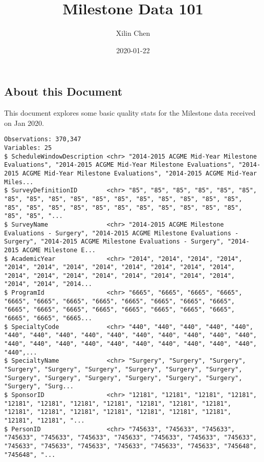 \documentclass[]{article}
\title{Milestone Data 101}
\author{Xilin Chen}
\date{2020-01-22}
\begin{document}
\maketitle

\hypertarget{about-this-document}{%
\subsection{About this Document}\label{about-this-document}}

This document explores some basic quality stats for the Milestone data
received on Jan 2020.

\begin{verbatim}
Observations: 370,347
Variables: 25
$ ScheduleWindowDescription <chr> "2014-2015 ACGME Mid-Year Milestone Evaluations", "2014-2015 ACGME Mid-Year Milestone Evaluations", "2014-2015 ACGME Mid-Year Milestone Evaluations", "2014-2015 ACGME Mid-Year Miles...
$ SurveyDefinitionID        <chr> "85", "85", "85", "85", "85", "85", "85", "85", "85", "85", "85", "85", "85", "85", "85", "85", "85", "85", "85", "85", "85", "85", "85", "85", "85", "85", "85", "85", "85", "85", "...
$ SurveyName                <chr> "2014-2015 ACGME Milestone Evaluations - Surgery", "2014-2015 ACGME Milestone Evaluations - Surgery", "2014-2015 ACGME Milestone Evaluations - Surgery", "2014-2015 ACGME Milestone E...
$ AcademicYear              <chr> "2014", "2014", "2014", "2014", "2014", "2014", "2014", "2014", "2014", "2014", "2014", "2014", "2014", "2014", "2014", "2014", "2014", "2014", "2014", "2014", "2014", "2014", "2014...
$ ProgramId                 <chr> "6665", "6665", "6665", "6665", "6665", "6665", "6665", "6665", "6665", "6665", "6665", "6665", "6665", "6665", "6665", "6665", "6665", "6665", "6665", "6665", "6665", "6665", "6665...
$ SpecialtyCode             <chr> "440", "440", "440", "440", "440", "440", "440", "440", "440", "440", "440", "440", "440", "440", "440", "440", "440", "440", "440", "440", "440", "440", "440", "440", "440", "440",...
$ SpecialtyName             <chr> "Surgery", "Surgery", "Surgery", "Surgery", "Surgery", "Surgery", "Surgery", "Surgery", "Surgery", "Surgery", "Surgery", "Surgery", "Surgery", "Surgery", "Surgery", "Surgery", "Surg...
$ SponsorID                 <chr> "12181", "12181", "12181", "12181", "12181", "12181", "12181", "12181", "12181", "12181", "12181", "12181", "12181", "12181", "12181", "12181", "12181", "12181", "12181", "12181", "...
$ PersonID                  <chr> "745633", "745633", "745633", "745633", "745633", "745633", "745633", "745633", "745633", "745633", "745633", "745633", "745633", "745633", "745633", "745633", "745648", "745648", "...

\end{verbatim}
\end{document}
